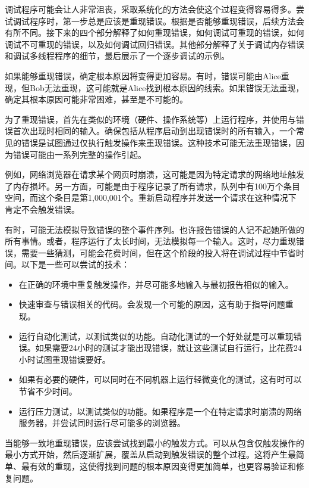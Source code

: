 
调试程序可能会让人非常沮丧，采取系统化的方法会使这个过程变得容易得多。尝试调试程序时，第一步总是应该是重现错误。根据是否能够重现错误，后续方法会有所不同。接下来的四个部分解释了如何重现错误，如何调试可重现的错误，如何调试不可重现的错误，以及如何调试回归错误。其他部分解释了关于调试内存错误和调试多线程程序的细节，最后展示了一个逐步调试的示例。


如果能够重现错误，确定根本原因将变得更加容易。有时，错误可能由Alice重现，但Bob无法重现，这可能就是Alice找到根本原因的线索。如果错误无法重现，确定其根本原因可能非常困难，甚至是不可能的。

为了重现错误，首先在类似的环境（硬件、操作系统等）上运行程序，并使用与错误首次出现时相同的输入。确保包括从程序启动到出现错误时的所有输入，一个常见的错误是试图通过仅执行触发操作来重现错误。这种技术可能无法重现错误，因为错误可能由一系列完整的操作引起。

例如，网络浏览器在请求某个网页时崩溃，这可能是因为特定请求的网络地址触发了内存损坏。另一方面，可能是由于程序记录了所有请求，队列中有100万个条目空间，而这个条目是第1,000,001个。重新启动程序并发送一个请求在这种情况下肯定不会触发错误。

有时，可能无法模拟导致错误的整个事件序列。也许报告错误的人记不起她所做的所有事情。或者，程序运行了太长时间，无法模拟每一个输入。这时，尽力重现错误，需要一些猜测，可能会花费时间，但在这个阶段的投入将在调试过程中节省时间。以下是一些可以尝试的技术：

\begin{itemize}
\item
在正确的环境中重复触发操作，并尽可能多地输入与最初报告相似的输入。

\item
快速审查与错误相关的代码。会发现一个可能的原因，这有助于指导问题重现。

\item
运行自动化测试，以测试类似的功能。自动化测试的一个好处就是可以重现错误。如果需要24小时的测试才能出现错误，就让这些测试自行运行，比花费24小时试图重现错误要好。

\item
如果有必要的硬件，可以同时在不同机器上运行轻微变化的测试，这有时可以节省不少时间。

\item
运行压力测试，以测试类似的功能。如果程序是一个在特定请求时崩溃的网络服务器，并尝试同时运行尽可能多的浏览器。
\end{itemize}

当能够一致地重现错误，应该尝试找到最小的触发方式。可以从包含仅触发操作的最小方式开始，然后逐渐扩展，覆盖从启动到触发错误的整个过程。这将产生最简单、最有效的重现，这使得找到问题的根本原因变得更加简单，也更容易验证和修复问题。

